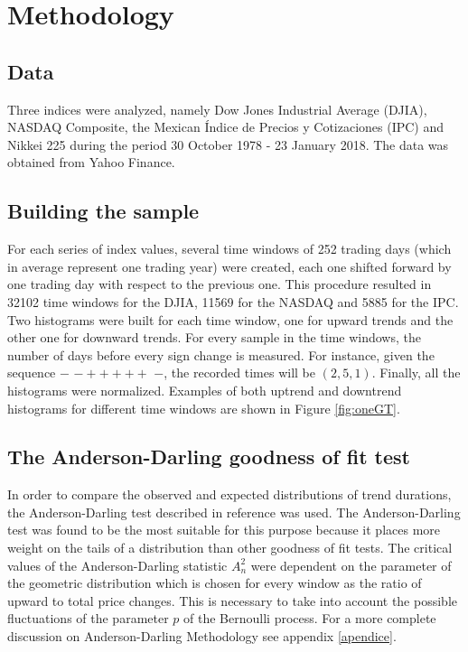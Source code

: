 \documentclass[a4paper]{jpconf}
\begin{document}
\section{Methodology}
\label{methodology}
\subsection{Data}
Three indices were analyzed, namely Dow Jones Industrial Average (DJIA), NASDAQ Composite, the Mexican \'Indice de Precios y Cotizaciones (IPC) and Nikkei 225 during the period 30 October 1978 - 23 January 2018. The data was obtained from Yahoo Finance.

\subsection{Building the sample}
For each series of index values, several time windows of 252 trading days (which in average represent one trading year) were created, each one shifted forward by one trading day with respect to the previous one. This procedure resulted in 32102 time windows for the DJIA, 11569 for the NASDAQ and 5885 for the IPC. Two histograms were built for each time window, one for upward trends and the other one for downward trends. For every sample in the time windows, the number of days before every sign change is measured. For instance, given the sequence $-$ $ - + + + + + $ $-$, the recorded times will be $(2,5,1)$. Finally, all the histograms were normalized. Examples of both uptrend and downtrend histograms for different time windows are shown in Figure \ref{fig:oneGT}.


\subsection{The Anderson-Darling goodness of fit test}
In order to compare the observed and expected distributions of  trend durations, the Anderson-Darling test described in reference \cite{Anderson} was used. The Anderson-Darling test was found to be the most suitable for this purpose because it places more weight on the tails of a distribution than other goodness of fit tests. The critical values of the Anderson-Darling statistic $A^{2}_{n}$ were dependent on the parameter of the geometric distribution which is chosen for every window as the ratio of upward to total price changes. This is necessary to take into account the possible fluctuations of the parameter $p$ of the Bernoulli process. For a more complete discussion on Anderson-Darling Methodology see appendix \ref{apendice}.
\end{document}
